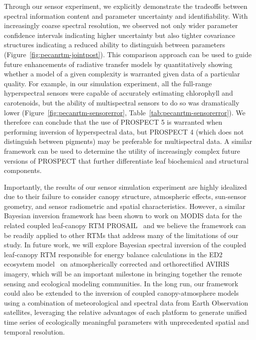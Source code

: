 Through our sensor experiment, we explicitly demonstrate the tradeoffs between spectral information content and parameter uncertainty and identifiability.
With increasingly coarse spectral resolution, we observed not only wider parameter confidence intervals indicating higher uncertainty but also tighter covariance structures indicating a reduced ability to distinguish between parameters (Figure~\ref{fig:pecanrtm-jointpost}). %
This comparison approach can be used to guide future enhancements of radiative transfer models by quantitatively showing whether a model of a given complexity is warranted given data of a particular quality.
For example, in our simulation experiment, all the full-range hyperspectral sensors were capable of accurately estimating chlorophyll and carotenoids, but the ability of multispectral sensors to do so was dramatically lower (Figure~\ref{fig:pecanrtm-sensorerror}, Table~\ref{tab:pecanrtm-sensorerror}). %
We therefore can conclude that the use of PROSPECT 5 is warranted when performing inversion of hyperspectral data, but PROSPECT 4 (which does not distinguish between pigments) may be preferable for multispectral data.
A similar framework can be used to determine the utility of increasingly complex future versions of PROSPECT that further differentiate leaf biochemical and structural components.

Importantly, the results of our sensor simulation experiment are highly idealized due to their failure to consider canopy structure, atmospheric effects, sun-sensor geometry, and sensor radiometric and spatial characteristics.
However, a similar Bayesian inversion framework has been shown to work on MODIS data for the related coupled leaf-canopy RTM PROSAIL~\cite{zhang_2005_estimating,zhang_2006_characterization,zhang_2009_satellite,zhang_2012_estimating} and we believe the framework can be readily applied to other RTMs that address many of the limitations of our study.
In future work, we will explore Bayesian spectral inversion of the coupled leaf-canopy RTM responsible for energy balance calculations in the ED2 ecosystem model~\cite{medvigy_2009_mechanistic} on atmospherically corrected and orthorectified AVIRIS imagery,
which will be an important milestone in bringing together the remote sensing and ecological modeling communities.
In the long run, our framework could also be extended to the inversion of coupled canopy-atmosphere models using a combination of meteorological and spectral data from Earth Observation satellites,
leveraging the relative advantages of each platform to generate unified time series of ecologically meaningful parameters with unprecedented spatial and temporal resolution.
